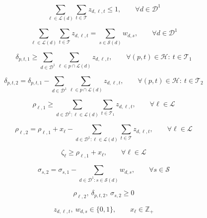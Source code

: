 \documentclass{article}
\begin{document}
\begin{equation}
\sum_{\ell\in \mathcal{L}(d)} \sum_{t\in \mathcal{T}} z_{d,\ell,t} \le 1,
\qquad \forall d \in \mathcal{D}^1
\tag{2}
\end{equation}

\begin{equation}
\sum_{\ell\in \mathcal{L}(d)} \sum_{t\in \mathcal{T}} z_{d,\ell,t}
=
\sum_{s\in \mathcal{S}(d)} w_{d,s},
\qquad \forall d \in \mathcal{D}^1
\tag{3}
\end{equation}

\begin{equation}
\delta_{p,t,1}
\ge
\sum_{d\in \mathcal{D}^1} \sum_{\ell\in p \cap \mathcal{L}(d)} z_{d,\ell,t},
\qquad \forall (p,t) \in \mathcal{H}:\ t \in \mathcal{T}_1
\tag{4}
\end{equation}

\begin{equation}
\delta_{p,t,2}
=
\delta_{p,t,1}
- \sum_{d\in \mathcal{D}^1} \sum_{\ell\in p \cap \mathcal{L}(d)} z_{d,\ell,t},
\qquad \forall (p,t) \in \mathcal{H}:\ t \in \mathcal{T}_2
\tag{5}
\end{equation}

\begin{equation}
\rho_{\ell,1}
\ge
\sum_{d\in \mathcal{D}^1:\ell\in \mathcal{L}(d)} \sum_{t\in \mathcal{T}_1} z_{d,\ell,t},
\qquad \forall \ell \in \mathcal{L}
\tag{6}
\end{equation}

\begin{equation}
\rho_{\ell,2}
=
\rho_{\ell,1} + x_\ell
- \sum_{d\in \mathcal{D}^1:\ell\in \mathcal{L}(d)} \sum_{t\in \mathcal{T}} z_{d,\ell,t},
\qquad \forall \ell \in \mathcal{L}
\tag{7}
\end{equation}

\begin{equation}
\zeta_\ell \ge \rho_{\ell,1} + x_\ell,
\qquad \forall \ell \in \mathcal{L}
\tag{8}
\end{equation}

\begin{equation}
\sigma_{s,2}
=
\sigma_{s,1} - \sum_{d\in \mathcal{D}^1:s\in\mathcal S(d)} w_{d,s},
\qquad \forall s \in \mathcal{S}
\tag{9}
\end{equation}

\begin{equation}
\rho_{\ell,2},\ \delta_{p,t,2},\ \sigma_{s,2} \ge 0
\tag{10}
\end{equation}

\begin{equation}
z_{d,\ell,t},\ w_{d,s} \in \{0,1\},
\qquad
x_\ell \in \mathbb{Z}_+
\tag{11}
\end{equation}
\end{document}
